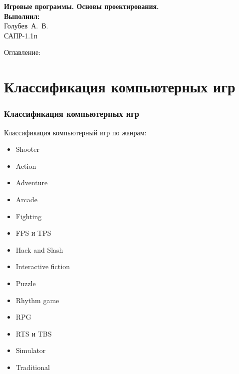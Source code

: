 \begin{frame}
    \begin{center}
        \vspace{3.0cm}
        \normalsize
        \textbf{Игровые программы. Основы проектирования.} \\
        \vspace{1.5cm}
        \raggedleft\small\textbf{Выполнил:}\\Голубев~А.~В.\\САПР-1.1п\\
        \vspace{1.8cm}
        \vspace{\fill}
         \the\year
    \end{center}
\end{frame}

\begin{frame}
    Оглавление:
    \tableofcontents
\end{frame}

\section{Классификация компьютерных игр}
\begin{frame}
    \frametitle{Классификация компьютерных игр}
    Классификация компьютерный игр по жанрам:
    \begin{minipage}[t]{0.47\textwidth}
        \begin{itemize}
            \item Shooter
            \item Action
            \item Adventure
            \item Arcade
            \item Fighting
            \item FPS и TPS
            \item Hack and Slash
        \end{itemize}
    \end{minipage}
    \begin{minipage}[t]{0.47\textwidth}
        \begin{itemize}
            \item Interactive fiction
            \item Puzzle
            \item Rhythm game
            \item RPG
            \item RTS и TBS
            \item Simulator
            \item Traditional
        \end{itemize}
    \end{minipage}
\end{frame}


